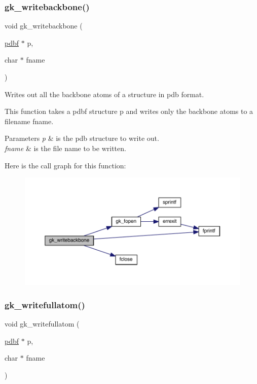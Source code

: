 \subsubsection{\texorpdfstring{gk\+\_\+writebackbone()}{gk\_writebackbone()}}
{\footnotesize\ttfamily void gk\+\_\+writebackbone (\begin{DoxyParamCaption}\item[{\hyperlink{a00666}{pdbf} $\ast$}]{p,  }\item[{char $\ast$}]{fname }\end{DoxyParamCaption})}



Writes out all the backbone atoms of a structure in pdb format. 

This function takes a pdbf structure p and writes only the backbone atoms to a filename fname.


\begin{DoxyParams}{Parameters}
{\em p} & is the pdb structure to write out. \\
\hline
{\em fname} & is the file name to be written. \\
\hline
\end{DoxyParams}
Here is the call graph for this function\+:\nopagebreak
\begin{figure}[H]
\begin{center}
\leavevmode
\includegraphics[width=350pt]{a00077_a04817c574e29493f0363ef81b41f82df_cgraph}
\end{center}
\end{figure}
\mbox{\label{a00077_a786192984ea62e6824ae9a2d1b902574}} 
\subsubsection{\texorpdfstring{gk\+\_\+writefullatom()}{gk\_writefullatom()}}
{\footnotesize\ttfamily void gk\+\_\+writefullatom (\begin{DoxyParamCaption}\item[{\hyperlink{a00666}{pdbf} $\ast$}]{p,  }\item[{char $\ast$}]{fname }\end{DoxyParamCaption})}




